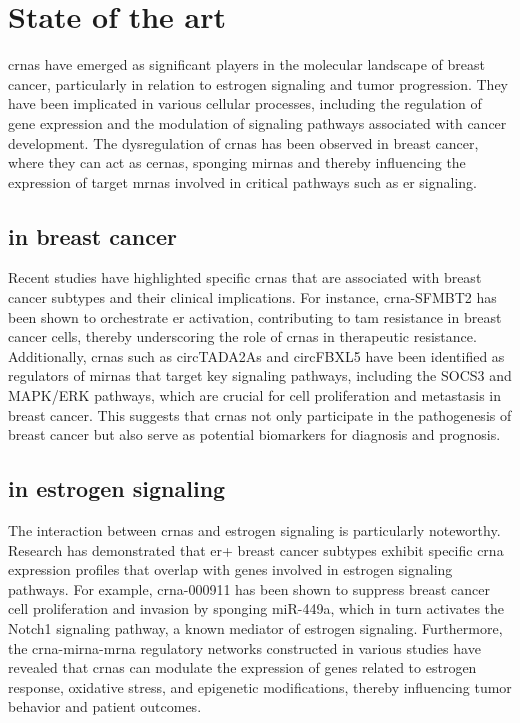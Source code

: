 \section{State of the art}
\label{sec:sota}
\Glspl{crna} have emerged as significant players in the
molecular landscape of breast cancer, particularly in relation to estrogen
signaling and tumor progression.
They have been implicated in various cellular processes, including the
regulation of gene expression and the modulation of signaling pathways
associated with cancer
development\supercite{li_circrna-sfmbt2_2023,tran_new_2020}.
The dysregulation of \glspl{crna} has been observed in breast cancer, where
they can act as \glspl{cerna}, sponging \glspl{mirna} and thereby influencing
the expression of target \glspl{mrna} involved in critical pathways such as
\gls{er} signaling\supercite{nair_circular_2016,xu_circrna_2022}.

\subsection{ in breast cancer}
Recent studies have highlighted specific \glspl{crna} that are associated with
breast cancer subtypes and their clinical implications.
For instance, \gls{crna}-SFMBT2 has been shown to orchestrate
\gls{er}\textalpha{} activation, contributing to \gls{tam} resistance in breast
cancer cells, thereby underscoring the role of \glspl{crna} in therapeutic
resistance\supercite{li_circrna-sfmbt2_2023}.
Additionally, \glspl{crna} such as circTADA2As and circFBXL5 have been
identified as regulators of \glspl{mirna} that target key signaling pathways,
including the SOCS3 and MAPK/ERK pathways, which are crucial for cell
proliferation and metastasis in breast
cancer\supercite{xu_circtada2as_2019,gao_hsa_circrna_0006528_2019}.
This suggests that \glspl{crna} not only participate in the pathogenesis of
breast cancer but also serve as potential biomarkers for diagnosis and
prognosis\supercite{liu_influence_2021,chen_circepsti1_2018}.

\subsection{ in estrogen signaling}
The interaction between \glspl{crna} and estrogen signaling is particularly
noteworthy.
Research has demonstrated that \gls{er+} breast cancer subtypes exhibit
specific \gls{crna} expression profiles that overlap with genes involved in
estrogen signaling pathways\supercite{nair_circular_2016}.
For example, \gls{crna}-000911 has been shown to suppress breast cancer cell
proliferation and invasion by sponging miR-449a, which in turn activates the
Notch1 signaling pathway, a known mediator of estrogen
signaling\supercite{wang_comprehensive_2018}.
Furthermore, the \gls{crna}-\gls{mirna}-\gls{mrna} regulatory networks
constructed in various studies have revealed that \glspl{crna} can modulate the
expression of genes related to estrogen response, oxidative stress, and
epigenetic modifications, thereby influencing tumor behavior and patient
outcomes\supercite{xu_circrna_2022,nair_circular_2016}.
